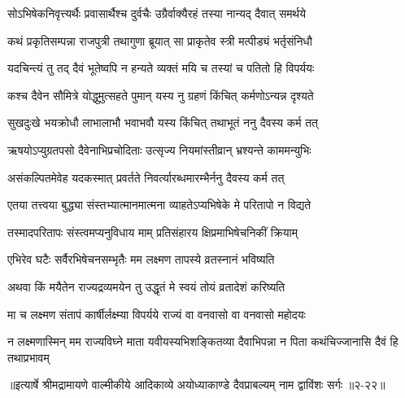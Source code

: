 \twolineshloka
{सोऽभिषेकनिवृत्त्यर्थैः प्रवासार्थैश्च दुर्वचैः}
{उग्रैर्वाक्यैरहं तस्या नान्यद् दैवात् समर्थये} %

\twolineshloka
{कथं प्रकृतिसम्पन्ना राजपुत्री तथागुणा}
{ब्रूयात् सा प्राकृतेव स्त्री मत्पीड्यं भर्तृसंनिधौ} %

\twolineshloka
{यदचिन्त्यं तु तद् दैवं भूतेष्वपि न हन्यते}
{व्यक्तं मयि च तस्यां च पतितो हि विपर्ययः} %

\twolineshloka
{कश्च दैवेन सौमित्रे योद्धुमुत्सहते पुमान्}
{यस्य नु ग्रहणं किंचित् कर्मणोऽन्यन्न दृश्यते} %

\twolineshloka
{सुखदुःखे भयक्रोधौ लाभालाभौ भवाभवौ}
{यस्य किंचित् तथाभूतं ननु दैवस्य कर्म तत्} %

\twolineshloka
{ऋषयोऽप्युग्रतपसो दैवेनाभिप्रचोदिताः}
{उत्सृज्य नियमांस्तीव्रान् भ्रश्यन्ते काममन्युभिः} %

\twolineshloka
{असंकल्पितमेवेह यदकस्मात् प्रवर्तते}
{निवर्त्यारब्धमारम्भैर्ननु दैवस्य कर्म तत्} %

\twolineshloka
{एतया तत्त्वया बुद्ध्या संस्तभ्यात्मानमात्मना}
{व्याहतेऽप्यभिषेके मे परितापो न विद्यते} %

\twolineshloka
{तस्मादपरितापः संस्त्वमप्यनुविधाय माम्}
{प्रतिसंहारय क्षिप्रमाभिषेचनिकीं क्रियाम्} %

\twolineshloka
{एभिरेव घटैः सर्वैरभिषेचनसम्भृतैः}
{मम लक्ष्मण तापस्ये व्रतस्नानं भविष्यति} %

\twolineshloka
{अथवा किं मयैतेन राज्यद्रव्यमयेन तु}
{उद्धृतं मे स्वयं तोयं व्रतादेशं करिष्यति} %

\twolineshloka
{मा च लक्ष्मण संतापं कार्षीर्लक्ष्म्या विपर्यये}
{राज्यं वा वनवासो वा वनवासो महोदयः} %

\twolineshloka
{न लक्ष्मणास्मिन् मम राज्यविघ्ने माता यवीयस्यभिशङ्कितव्या}
{दैवाभिपन्ना न पिता कथंचिज्जानासि दैवं हि तथाप्रभावम्} %


॥इत्यार्षे श्रीमद्रामायणे वाल्मीकीये आदिकाव्ये अयोध्याकाण्डे दैवप्राबल्यम् नाम द्वाविंशः सर्गः ॥२-२२॥
